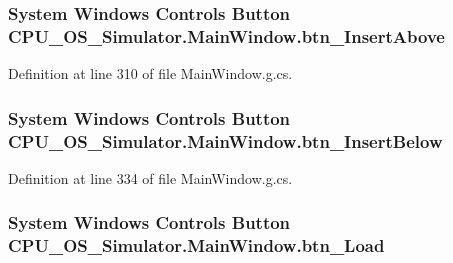 \subsubsection[{btn\+\_\+\+Insert\+Above}]{\setlength{\rightskip}{0pt plus 5cm}System Windows Controls Button C\+P\+U\+\_\+\+O\+S\+\_\+\+Simulator.\+Main\+Window.\+btn\+\_\+\+Insert\+Above\hspace{0.3cm}{\ttfamily [package]}}\label{class_c_p_u___o_s___simulator_1_1_main_window_a23c681375b103d2294ac79c51f1fb406}


Definition at line 310 of file Main\+Window.\+g.\+cs.

\hypertarget{class_c_p_u___o_s___simulator_1_1_main_window_a7c6c417d0bd3af11e77f86cf2cfb03fe}{}
\subsubsection[{btn\+\_\+\+Insert\+Below}]{\setlength{\rightskip}{0pt plus 5cm}System Windows Controls Button C\+P\+U\+\_\+\+O\+S\+\_\+\+Simulator.\+Main\+Window.\+btn\+\_\+\+Insert\+Below\hspace{0.3cm}{\ttfamily [package]}}\label{class_c_p_u___o_s___simulator_1_1_main_window_a7c6c417d0bd3af11e77f86cf2cfb03fe}


Definition at line 334 of file Main\+Window.\+g.\+cs.

\hypertarget{class_c_p_u___o_s___simulator_1_1_main_window_a29fbdb7afddedc9425472096337ee13b}{}
\subsubsection[{btn\+\_\+\+Load}]{\setlength{\rightskip}{0pt plus 5cm}System Windows Controls Button C\+P\+U\+\_\+\+O\+S\+\_\+\+Simulator.\+Main\+Window.\+btn\+\_\+\+Load\hspace{0.3cm}{\ttfamily [package]}}\label{class_c_p_u___o_s___simulator_1_1_main_window_a29fbdb7afddedc9425472096337ee13b}


